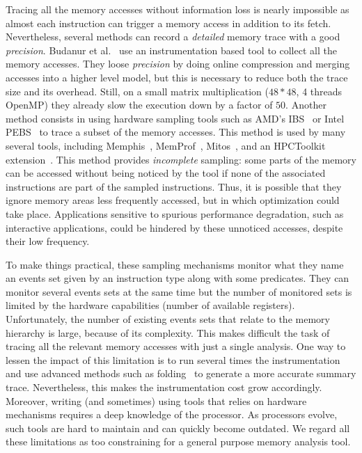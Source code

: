 Tracing all the memory accesses without information loss is nearly impossible as almost each instruction can trigger a memory access in addition to its fetch.
Nevertheless, several methods can record a \emph{detailed} memory trace with a good \emph{precision}.
Budanur et al.~\cite{Budanur11Memory} use an instrumentation based tool to collect all the memory accesses.
They loose \emph{precision} by doing online compression and merging accesses into a higher level model, but this is necessary to reduce both the trace size and its overhead.
Still, on a small matrix multiplication ($48*48$, 4 threads \gls{OpenMP}) they already slow the execution down by a factor of $50$.
Another method consists in using hardware sampling tools such as AMD's \gls{IBS}~\cite{Drongowski07Instructionbased} or Intel \gls{PEBS}~\cite{Levinthal09Performance} to trace a subset of the memory accesses.
This method is used by many several tools, including \gls{Memphis}~\cite{McCurdy10Memphis}, \gls{MemProf}~\cite{Lachaize12MemProf}, \gls{Mitos}~\cite{Gimenez14Dissecting}, and an \gls{HPCToolkit} extension~\cite{Liu14Tool}.
This method provides \emph{incomplete} sampling: some parts of the memory can be accessed without being noticed by the tool if none of the associated instructions are part of the sampled instructions.
Thus, it is possible that they ignore memory areas less frequently accessed, but in which optimization could take place.
Applications sensitive to spurious performance degradation, such as interactive applications, could be hindered by these unnoticed accesses, despite their low frequency.

To make things practical, these sampling mechanisms monitor what they name an events set given by an instruction type along with some predicates.
They can monitor several events sets at the same time but the number of monitored sets is limited by the hardware capabilities (number of available registers).
Unfortunately, the number of existing events sets that relate to the memory hierarchy is large, because of its complexity.
This makes difficult the task of tracing all the relevant memory accesses with just a single analysis.
One way to lessen the impact of this limitation is to run several times the instrumentation and use advanced methods such as folding~\cite{Servat15Towards} to generate a more accurate summary trace.
Nevertheless, this makes the instrumentation cost grow accordingly.
Moreover, writing (and sometimes) using tools that relies on hardware mechanisms requires a deep knowledge of the processor.
As processors evolve, such tools are hard to maintain and can quickly become outdated.
We regard all these limitations as too constraining for a general purpose memory analysis tool.

